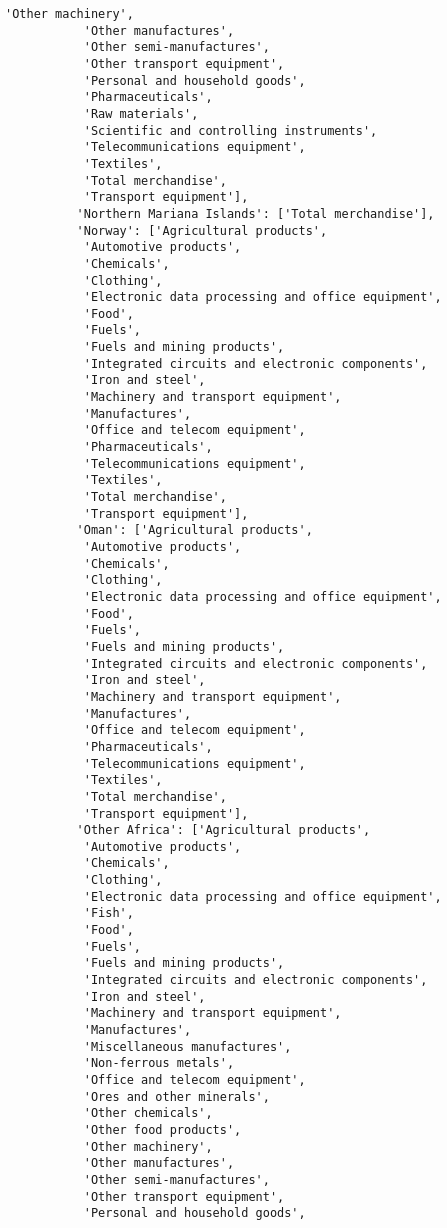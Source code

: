 \documentclass[11pt]{article}
\begin{document}
\begin{Verbatim}[commandchars=\\\{\}]
           'Other machinery',
           'Other manufactures',
           'Other semi-manufactures',
           'Other transport equipment',
           'Personal and household goods',
           'Pharmaceuticals',
           'Raw materials',
           'Scientific and controlling instruments',
           'Telecommunications equipment',
           'Textiles',
           'Total merchandise',
           'Transport equipment'],
          'Northern Mariana Islands': ['Total merchandise'],
          'Norway': ['Agricultural products',
           'Automotive products',
           'Chemicals',
           'Clothing',
           'Electronic data processing and office equipment',
           'Food',
           'Fuels',
           'Fuels and mining products',
           'Integrated circuits and electronic components',
           'Iron and steel',
           'Machinery and transport equipment',
           'Manufactures',
           'Office and telecom equipment',
           'Pharmaceuticals',
           'Telecommunications equipment',
           'Textiles',
           'Total merchandise',
           'Transport equipment'],
          'Oman': ['Agricultural products',
           'Automotive products',
           'Chemicals',
           'Clothing',
           'Electronic data processing and office equipment',
           'Food',
           'Fuels',
           'Fuels and mining products',
           'Integrated circuits and electronic components',
           'Iron and steel',
           'Machinery and transport equipment',
           'Manufactures',
           'Office and telecom equipment',
           'Pharmaceuticals',
           'Telecommunications equipment',
           'Textiles',
           'Total merchandise',
           'Transport equipment'],
          'Other Africa': ['Agricultural products',
           'Automotive products',
           'Chemicals',
           'Clothing',
           'Electronic data processing and office equipment',
           'Fish',
           'Food',
           'Fuels',
           'Fuels and mining products',
           'Integrated circuits and electronic components',
           'Iron and steel',
           'Machinery and transport equipment',
           'Manufactures',
           'Miscellaneous manufactures',
           'Non-ferrous metals',
           'Office and telecom equipment',
           'Ores and other minerals',
           'Other chemicals',
           'Other food products',
           'Other machinery',
           'Other manufactures',
           'Other semi-manufactures',
           'Other transport equipment',
           'Personal and household goods',

\end{Verbatim}
\end{document}
